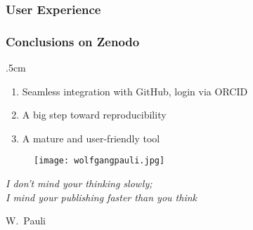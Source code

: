 \begin{frame}
\frametitle{User Experience}
\end{frame}

\begin{frame}[c]
\frametitle{Conclusions on Zenodo}

\parskip .5cm
\begin{enumerate}
\item Seamless integration with GitHub, login via ORCID
\item A big step toward reproducibility
\item A mature and user-friendly tool
\end{enumerate}

\end{frame}


\begin{frame}
\begin{figure}
\centering
\texttt{[image: wolfgangpauli.jpg]}
\end{figure}

\textit{I don't mind your thinking slowly;\\
I mind your publishing faster than you think}

\vspace{.25cm}

W.~Pauli
\end{frame}




